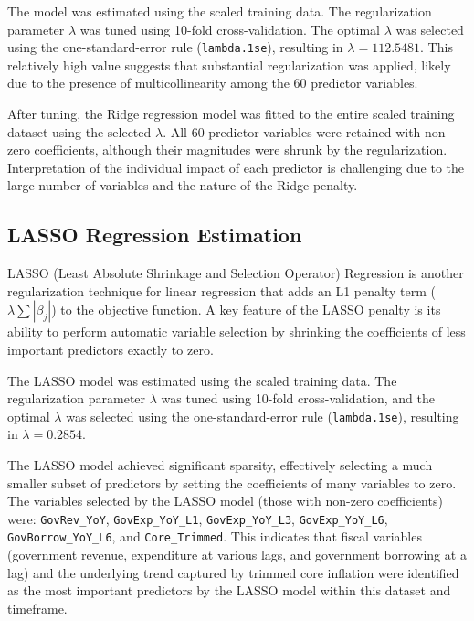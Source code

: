 \documentclass[12pt,a4paper]{article}
\begin{document}
The model was estimated using the scaled training data. The regularization parameter $\lambda$ was tuned using 10-fold cross-validation. The optimal $\lambda$ was selected using the one-standard-error rule (\texttt{lambda.1se}), resulting in $\lambda = 112.5481$. This relatively high value suggests that substantial regularization was applied, likely due to the presence of multicollinearity among the 60 predictor variables.

After tuning, the Ridge regression model was fitted to the entire scaled training dataset using the selected $\lambda$. All 60 predictor variables were retained with non-zero coefficients, although their magnitudes were shrunk by the regularization. Interpretation of the individual impact of each predictor is challenging due to the large number of variables and the nature of the Ridge penalty.

\subsection{LASSO Regression Estimation}
LASSO (Least Absolute Shrinkage and Selection Operator) Regression is another regularization technique for linear regression that adds an L1 penalty term ($\lambda \sum |\beta_j|$) to the objective function. A key feature of the LASSO penalty is its ability to perform automatic variable selection by shrinking the coefficients of less important predictors exactly to zero.

The LASSO model was estimated using the scaled training data. The regularization parameter $\lambda$ was tuned using 10-fold cross-validation, and the optimal $\lambda$ was selected using the one-standard-error rule (\texttt{lambda.1se}), resulting in $\lambda = 0.2854$.

The LASSO model achieved significant sparsity, effectively selecting a much smaller subset of predictors by setting the coefficients of many variables to zero. The variables selected by the LASSO model (those with non-zero coefficients) were: \texttt{GovRev\_YoY}, \texttt{GovExp\_YoY\_L1}, \texttt{GovExp\_YoY\_L3}, \texttt{GovExp\_YoY\_L6}, \texttt{GovBorrow\_YoY\_L6}, and \texttt{Core\_Trimmed}. This indicates that fiscal variables (government revenue, expenditure at various lags, and government borrowing at a lag) and the underlying trend captured by trimmed core inflation were identified as the most important predictors by the LASSO model within this dataset and timeframe.
\end{document}
